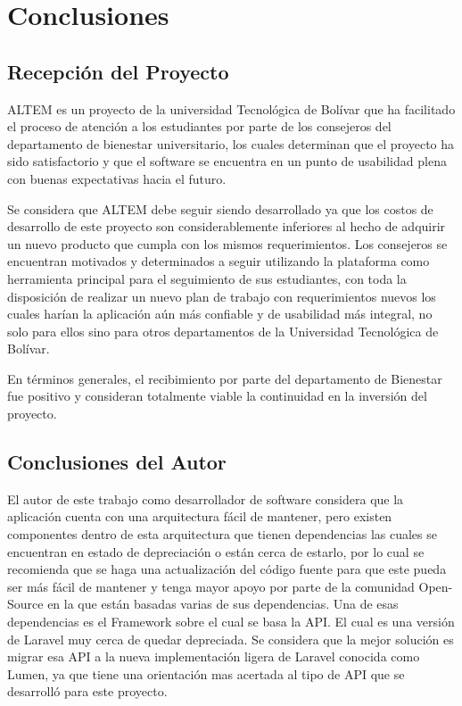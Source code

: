 \chapter{Conclusiones}
\section{Recepción del Proyecto}
ALTEM es un proyecto de la universidad Tecnológica de Bolívar que ha facilitado el proceso de atención a los estudiantes por parte de los consejeros del departamento de bienestar universitario, los cuales determinan que el proyecto ha sido satisfactorio y que el software se encuentra en un punto de usabilidad plena con buenas expectativas hacia el futuro. 

Se considera que ALTEM debe seguir siendo desarrollado ya que los costos de desarrollo de este proyecto son considerablemente inferiores al hecho de adquirir un nuevo producto que cumpla con los mismos requerimientos. 
Los consejeros se encuentran motivados y determinados a seguir utilizando la plataforma como herramienta principal para el seguimiento de sus estudiantes, con toda la disposición de realizar un nuevo plan de trabajo con requerimientos nuevos los cuales harían la aplicación aún más confiable y de usabilidad más integral, no solo para ellos sino para otros departamentos de la Universidad Tecnológica de Bolívar. 

En términos generales, el recibimiento por parte del departamento de Bienestar fue positivo y consideran totalmente viable la continuidad en la inversión del proyecto.

\section{Conclusiones del Autor}
El autor de este trabajo como desarrollador de software considera que la aplicación cuenta con una arquitectura fácil de mantener, pero existen componentes dentro de esta arquitectura que tienen dependencias las cuales se encuentran en estado de depreciación o están cerca de estarlo, por lo cual se recomienda que se haga una actualización del código fuente para que este pueda ser más fácil de mantener y tenga mayor apoyo por parte de la comunidad Open-Source en la que están basadas varias de sus dependencias.
Una de esas dependencias es el Framework sobre el cual se basa la API. El cual es una versión de Laravel muy cerca de quedar depreciada. Se considera que la mejor solución es migrar esa API a la nueva implementación ligera de Laravel conocida como Lumen, ya que tiene una orientación mas acertada al tipo de API que se desarrolló para este proyecto.


